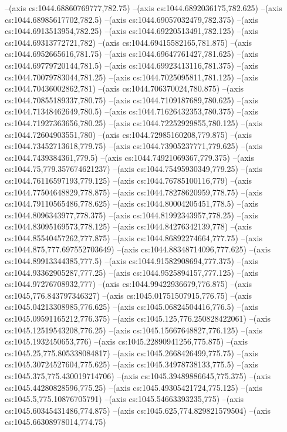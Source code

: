 --(axis cs:1044.68860769777,782.75)
--(axis cs:1044.6892036175,782.625)
--(axis cs:1044.68985617702,782.5)
--(axis cs:1044.69057032479,782.375)
--(axis cs:1044.6913513954,782.25)
--(axis cs:1044.69220513491,782.125)
--(axis cs:1044.69313772721,782)
--(axis cs:1044.69415582165,781.875)
--(axis cs:1044.6952665616,781.75)
--(axis cs:1044.69647761427,781.625)
--(axis cs:1044.69779720144,781.5)
--(axis cs:1044.69923413116,781.375)
--(axis cs:1044.70079783044,781.25)
--(axis cs:1044.7025095811,781.125)
--(axis cs:1044.70436002862,781)
--(axis cs:1044.706370024,780.875)
--(axis cs:1044.70855189337,780.75)
--(axis cs:1044.7109187689,780.625)
--(axis cs:1044.71348462649,780.5)
--(axis cs:1044.71626432353,780.375)
--(axis cs:1044.71927363656,780.25)
--(axis cs:1044.72252929855,780.125)
--(axis cs:1044.72604903551,780)
--(axis cs:1044.72985160208,779.875)
--(axis cs:1044.73452713618,779.75)
--(axis cs:1044.73905237771,779.625)
--(axis cs:1044.7439384361,779.5)
--(axis cs:1044.74921069367,779.375)
--(axis cs:1044.75,779.357674621237)
--(axis cs:1044.75495930349,779.25)
--(axis cs:1044.76116597193,779.125)
--(axis cs:1044.76785100116,779)
--(axis cs:1044.77504648829,778.875)
--(axis cs:1044.78278620959,778.75)
--(axis cs:1044.79110565486,778.625)
--(axis cs:1044.80004205451,778.5)
--(axis cs:1044.8096343977,778.375)
--(axis cs:1044.81992343957,778.25)
--(axis cs:1044.83095169573,778.125)
--(axis cs:1044.84276342139,778)
--(axis cs:1044.85540457262,777.875)
--(axis cs:1044.86892274664,777.75)
--(axis cs:1044.875,777.697552703649)
--(axis cs:1044.88348714096,777.625)
--(axis cs:1044.89913344385,777.5)
--(axis cs:1044.91582908694,777.375)
--(axis cs:1044.93362905287,777.25)
--(axis cs:1044.9525894157,777.125)
--(axis cs:1044.97276708932,777)
--(axis cs:1044.99422936679,776.875)
--(axis cs:1045,776.843797346327)
--(axis cs:1045.01751507915,776.75)
--(axis cs:1045.04213308985,776.625)
--(axis cs:1045.06824504416,776.5)
--(axis cs:1045.09591165212,776.375)
--(axis cs:1045.125,776.250828422061)
--(axis cs:1045.12519543208,776.25)
--(axis cs:1045.15667648827,776.125)
--(axis cs:1045.1932450653,776)
--(axis cs:1045.22890941256,775.875)
--(axis cs:1045.25,775.805338084817)
--(axis cs:1045.2668426499,775.75)
--(axis cs:1045.30724527604,775.625)
--(axis cs:1045.34978738133,775.5)
--(axis cs:1045.375,775.430019714706)
--(axis cs:1045.39489886645,775.375)
--(axis cs:1045.44280828596,775.25)
--(axis cs:1045.49305421724,775.125)
--(axis cs:1045.5,775.10876705791)
--(axis cs:1045.54663393235,775)
--(axis cs:1045.60345431486,774.875)
--(axis cs:1045.625,774.829821579504)
--(axis cs:1045.66308978014,774.75)
